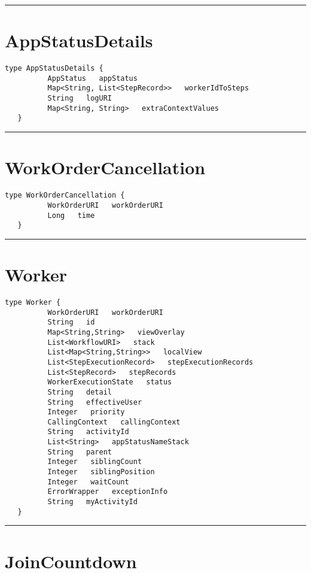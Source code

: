 \rule{12cm}{2pt}
\section{AppStatusDetails}
\label{type:AppStatusDetails}

\begin{lstlisting}[style=nonumbers]
   type AppStatusDetails {
          AppStatus   appStatus
          Map<String, List<StepRecord>>   workerIdToSteps
          String   logURI
          Map<String, String>   extraContextValues
   }
\end{lstlisting}

\rule{12cm}{2pt}
\section{WorkOrderCancellation}
\label{type:WorkOrderCancellation}

\begin{lstlisting}[style=nonumbers]
   type WorkOrderCancellation {
          WorkOrderURI   workOrderURI
          Long   time
   }
\end{lstlisting}

\rule{12cm}{2pt}
\section{Worker}
\label{type:Worker}

\begin{lstlisting}[style=nonumbers]
   type Worker {
          WorkOrderURI   workOrderURI
          String   id
          Map<String,String>   viewOverlay
          List<WorkflowURI>   stack
          List<Map<String,String>>   localView
          List<StepExecutionRecord>   stepExecutionRecords
          List<StepRecord>   stepRecords
          WorkerExecutionState   status
          String   detail
          String   effectiveUser
          Integer   priority
          CallingContext   callingContext
          String   activityId
          List<String>   appStatusNameStack
          String   parent
          Integer   siblingCount
          Integer   siblingPosition
          Integer   waitCount
          ErrorWrapper   exceptionInfo
          String   myActivityId
   }
\end{lstlisting}

\rule{12cm}{2pt}
\section{JoinCountdown}
\label{type:JoinCountdown}

